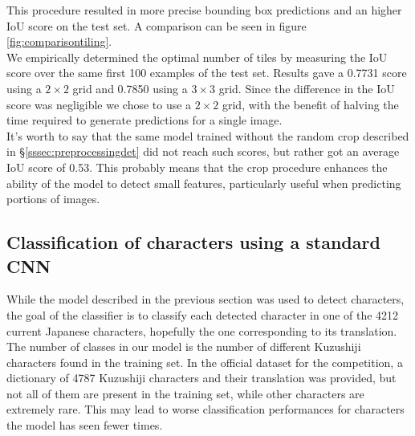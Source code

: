 This procedure resulted in more precise bounding box predictions and an higher IoU score on the test set. A comparison can be seen in figure \ref{fig:comparisontiling}. \\
We empirically determined the optimal number of tiles by measuring the IoU score over the same first 100 examples of the test set. Results gave a 0.7731 score using a $2 \times 2$ grid and 0.7850 using a $3 \times 3$ grid. 
Since the difference in the IoU score was negligible we chose to use a $2 \times 2$ grid, with the benefit of halving the time required to generate predictions for a single image.\\
It's worth to say that the same model trained without the random crop described in §\ref{sssec:preprocessingdet} did not reach such scores, but rather got an average IoU score of 0.53. This probably means that the crop procedure enhances the ability of the model to detect small features, particularly useful when predicting portions of images.

\iffalse
\begin{figure*}[h!]
	\centering
	\begin{subfigure}{\columnwidth}
		\centering
		\texttt{[image: detection/tiled\_prediction.png]}
		\caption{Predicion with $2\times2$ tiling}
		\label{fig:tiledpred}
	\end{subfigure}
	\begin{subfigure}{\columnwidth}
		\centering
		\texttt{[image: detection/standard\_prediction.png]}
		\caption{Predicion with no tiling}
		\label{fig:standardpred}
	\end{subfigure}
	\caption{Comparison of predicion on the same page with or without tiling. Image (\ref{fig:tiledpred}) has a IoU score of 0.83, while (\ref{fig:standardpred}) scored 0.59.}
	\label{fig:comparisontiling}
\end{figure*}
\fi

\subsection{Classification of characters using a standard CNN}
\label{ssec:classificationcnn}

While the model described in the previous section was used to detect characters, the goal of the classifier is to classify each detected character in one of the 4212 current Japanese characters, hopefully the one corresponding to its translation. The number of classes in our model is the number of different Kuzushiji characters found in the training set. In the official dataset for the competition, a dictionary of 4787 Kuzushiji characters and their translation was provided, but not all of them are present in the training set, while other characters are extremely rare. This may lead to worse classification performances for characters the model has seen fewer times.

